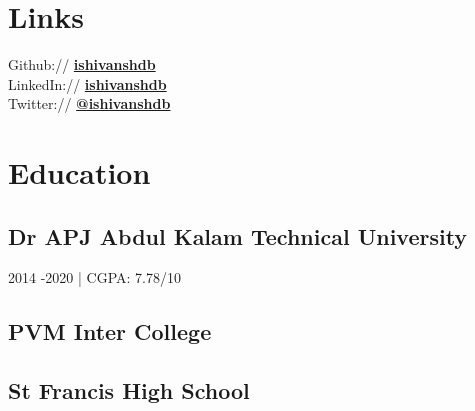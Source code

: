 \documentclass[]{deedy-resume-openfont}
\begin{document}
%
%

%
%

\begin{minipage}[t]{0.33\textwidth} 


\section{Links} 
Github:// \href{https://github.com/ishivanshdb}{\bf ishivanshdb} \\
LinkedIn://  \href{https://www.linkedin.com/in/ishivanshdb}{\bf ishivanshdb} \\
Twitter://  \href{https://twitter.com/ishivanshdb}{\bf @ishivanshdb} \\


\section{Education} 

\subsection{Dr APJ Abdul Kalam Technical University}
2014 -2020 | CGPA: 7.78/10 \\
\sectionsep

\subsection{PVM Inter College}
\sectionsep

\subsection{St Francis High School}
\sectionsep


\end{minipage}
\end{document}
